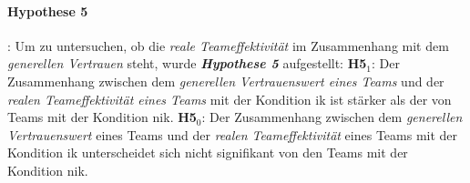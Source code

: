 \documentclass[a4paper,11pt]{article}%
\renewcommand{\\}{\vspace*{0.5\baselineskip} \newline}
\begin{document}
\paragraph{Hypothese 5}:
Um zu untersuchen, ob die \textit{reale Teameffektivität} im Zusammenhang mit dem \textit{generellen Vertrauen} steht, wurde \textbf{\textit{Hypothese 5}} aufgestellt:\\
\textbf{H5$_{1}$}: Der Zusammenhang zwischen dem \textit{generellen Vertrauenswert eines Teams} und der \textit{realen Teameffektivität eines Teams} mit der Kondition \ac{ik} ist stärker als der von Teams mit der Kondition \ac{nik}. \newline
\textbf{H5$_{0}$}: Der Zusammenhang zwischen dem \textit{generellen Vertrauenswert} eines Teams und der \textit{realen Teameffektivität} eines Teams mit der Kondition \ac{ik} unterscheidet sich nicht signifikant von den Teams mit der Kondition \ac{nik}. \\
%
%
%


\end{document}
